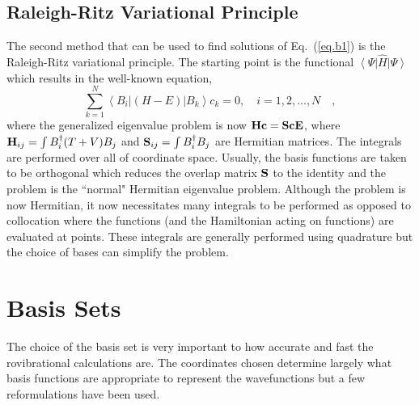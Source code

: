 \subsection{Raleigh-Ritz Variational Principle}
The second method that can be used to find solutions of Eq.~(\ref{eq.b1}) is the Raleigh-Ritz variational principle.  The starting point is the functional $\left<\Psi\right|\hat{H}\left|\Psi\right>$ which results in the well-known equation,
\begin{equation}\label{eq.b27}
 \sum_{k=1}^{N}\left<B_i\right|\left(H-E\right) \left|B_k\right>c_k=0,\quad i=1,2,...,N\quad,
 \end{equation}
where the generalized eigenvalue problem is now ${{\bf Hc}}={{\bf ScE}}$, where ${{\bf H}}_{ij}=\int B_i^{\dagger}(T+V)B_j$ and ${{\bf S}}_{ij}=\int B_i^{\dagger}B_j$ are Hermitian matrices. The integrals are performed over all of coordinate space.  Usually, the basis functions are taken to be orthogonal which reduces the overlap matrix ${{\bf S}}$ to the identity and the problem is the ``normal" Hermitian eigenvalue problem.  Although the problem is now Hermitian, it now necessitates many integrals to be performed as opposed to collocation where the functions (and the Hamiltonian acting on functions) are evaluated at points.  These integrals are generally performed using quadrature but the choice of bases can simplify the problem. 
 
\section{Basis Sets}
The choice of the basis set is very important to how accurate and fast the rovibrational calculations are.  The coordinates chosen determine largely what basis functions are appropriate to represent the wavefunctions but a few reformulations have been used.

